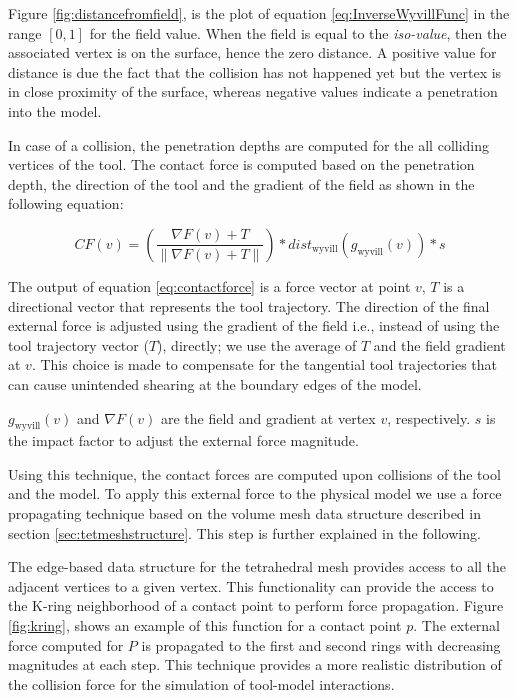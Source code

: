 Figure \ref{fig:distancefromfield}, is the plot of equation \ref{eq:InverseWyvillFunc} 
in the range $\left[0, 1\right]$ for the field value. When the field is equal to 
the \textit{iso-value}, then the associated vertex is on the surface, hence the zero distance. 
A positive value for distance is due the fact that the collision has not happened yet but the vertex 
is in close proximity of the surface, whereas negative values indicate a penetration into the model. 

In case of a collision, the penetration depths are computed for the all colliding vertices of the tool.
The contact force is computed based on the penetration depth, the direction of the tool and the gradient 
of the field as shown in the following equation:

\begin{equation}
CF(v) = (\frac{\nabla F(v) + T} { \| \nabla F(v) + T \|}) * dist_\mathrm{wyvill}( g_\mathrm{wyvill}(v)) * 
s
\label{eq:contactforce} 
\end{equation}

The output of equation \ref{eq:contactforce} is a force vector at point $v$, $T$ is a directional vector that 
represents the tool trajectory. The direction of the final external force is adjusted using the gradient of 
the field i.e., instead of using the tool trajectory vector ($T$), directly; we use the average of $T$ and the field 
gradient at $v$. This choice is made to compensate for the tangential tool trajectories that can cause 
unintended shearing at the boundary edges of the model.

$g_\mathrm{wyvill}(v)$ and $\nabla F(v)$ are the field and gradient at vertex $v$, respectively. $s$ 
is the impact factor to adjust the external force magnitude.

Using this technique, the contact forces are computed upon collisions of the tool and the model. To
apply this external force to the physical model we use a force propagating technique based on 
the volume mesh data structure described in section \ref{sec:tetmeshstructure}. 
This step is further explained in the following.

The edge-based data structure for the tetrahedral mesh provides access to all the adjacent vertices to a 
given vertex. This functionality can provide the access to the K-ring neighborhood of a contact point to 
perform force propagation. Figure \ref{fig:kring}, shows an example of this function for a contact 
point $p$. The external force computed for $P$ is propagated to the first and second rings with 
decreasing magnitudes at each step. This technique provides a more realistic 
distribution of the collision force for the simulation of tool-model interactions.
 
